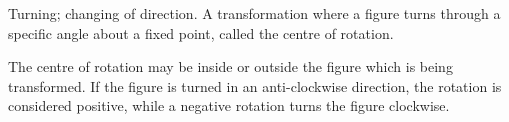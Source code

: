 Turning; changing of direction.
A transformation where a figure turns through a specific angle about a fixed point, 
called the centre of rotation.

\par
The centre of rotation may be inside or outside the figure 
which is being transformed.
If the figure is turned in an anti-clockwise direction,  the rotation is considered 
positive, while a negative rotation turns the figure clockwise.